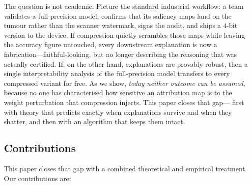 \documentclass{ieeeaccess}
\begin{document}
The question is not academic. Picture the standard industrial workflow: a team
validates a full-precision model, confirms that its saliency maps land on the
tumour rather than the scanner watermark, signs the audit, and ships a $4$-bit
version to the device. If compression quietly scrambles those maps while leaving
the accuracy figure untouched, every downstream explanation is now a
fabrication---faithful-looking, but no longer describing the reasoning that was
actually certified. If, on the other hand, explanations are provably robust, then
a single interpretability analysis of the full-precision model transfers to every
compressed variant for free. As we show, \emph{today neither outcome can be
assumed}, because no one has characterised how sensitive an attribution map is to
the weight perturbation that compression injects. This paper closes that gap---
first with theory that predicts exactly when explanations survive and when they
shatter, and then with an algorithm that keeps them intact.

\subsection{Contributions}
This paper closes that gap with a combined theoretical and empirical treatment.
Our contributions are:
\end{document}
